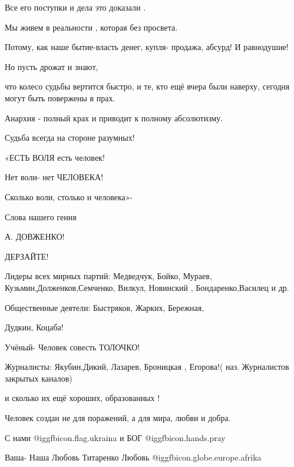 Все его поступки и дела это доказали .

 Мы живем в реальности , которая без просвета.

Потому, как наше бытие-власть денег, купля- продажа, абсурд! И равнодушие! 

Но пусть дрожат и знают,

что колесо судьбы вертится быстро, и те, кто ещё вчера были наверху, сегодня
могут быть повержены в прах.

Анархия - полный крах и приводит к полному абсолютизму. 

Судьба всегда на стороне разумных!  

«ЕСТЬ ВОЛЯ есть человек!

Нет воли- нет ЧЕЛОВЕКА!

Сколько воли, столько и человека»- 

 Слова нашего гения

 А. ДОВЖЕНКО!

ДЕРЗАЙТЕ! 

Лидеры всех мирных партий: Медведчук, Бойко, Мураев,
Кузьмин,Долженков,Семченко, Вилкул, Новинский  ,  Бондаренко,Василец и др.

 Общественные деятели: Быстряков, Жарких, Бережная, 

 Дудкин, Коцаба!

Учёный- Человек совесть ТОЛОЧКО! 

Журналисты: Якубин,Дикий, Лазарев, Броницкая , Егорова!( наз. Журналистов
закрытых каналов)

и сколько их ещё хороших, образованных !

Человек создан не для поражений, а для мира, любви и добра. 

С нами @igg{fbicon.flag.ukraina} и БОГ @igg{fbicon.hands.pray}  

Ваша- Наша Любовь Титаренко Любовь  @igg{fbicon.globe.europe.afrika} 

